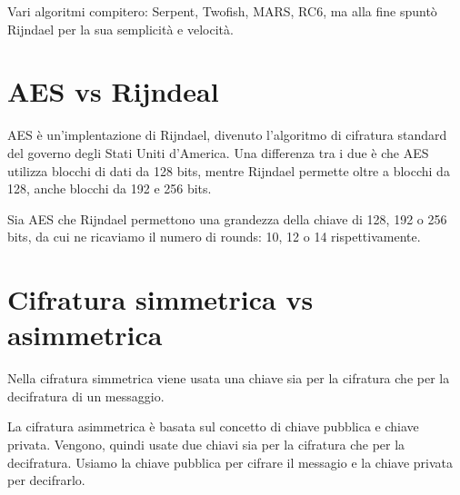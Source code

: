 \textsf{\small Vari algoritmi compitero: Serpent, Twofish, MARS, RC6, ma alla fine spuntò Rijndael per la sua semplicità e velocità.}



\section{AES vs Rijndeal}

\textsf{\small AES è un'implentazione di Rijndael, divenuto l'algoritmo di cifratura standard del governo degli Stati Uniti d'America.}
\textsf{\small Una differenza tra i due è che AES utilizza blocchi di dati da 128 bits, mentre Rijndael permette oltre a blocchi da 128, anche blocchi da 192 e 256 bits.} %

\textsf{\small Sia AES che Rijndael permettono una grandezza della chiave di 128, 192 o 256 bits, da cui ne ricaviamo il numero di rounds: 10, 12 o 14 rispettivamente.}

\section{Cifratura simmetrica vs asimmetrica} %

\textsf{\small Nella cifratura simmetrica viene usata una chiave sia per la cifratura che per la decifratura di un messaggio.}

\textsf{\small La cifratura asimmetrica è basata sul concetto di chiave pubblica e chiave privata. Vengono, quindi usate due chiavi sia per la cifratura che per la decifratura. Usiamo la chiave pubblica per cifrare il messagio e la chiave privata per decifrarlo.} %

